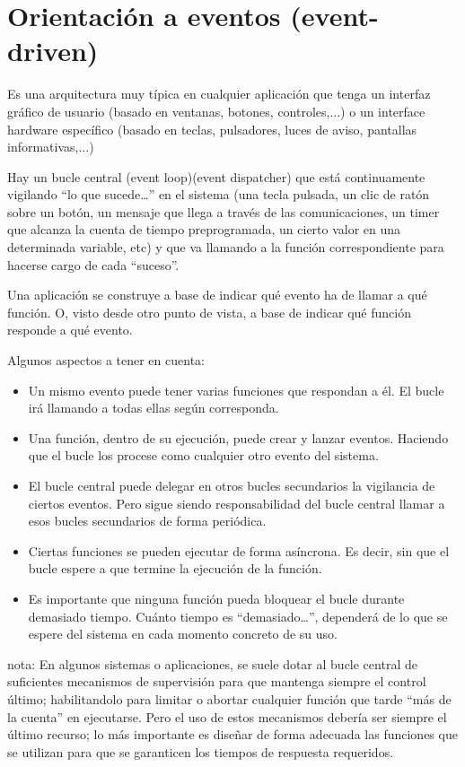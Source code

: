 \documentclass[spanish,12pt,a4paper,final,oneside]{book}
\begin{document}
\section{Orientación a eventos (event-driven)}\label{eventos}
Es una arquitectura muy típica en cualquier aplicación que tenga un interfaz gráfico de usuario (basado en ventanas, botones, controles,...) o un interface hardware específico (basado en teclas, pulsadores, luces de aviso, pantallas informativas,...)

Hay un bucle central (event loop)(event dispatcher) que está continuamente vigilando ``lo que sucede\ldots'' en el sistema (una tecla pulsada, un clic de ratón sobre un botón, un mensaje que llega a través de las comunicaciones, un timer que alcanza la cuenta de tiempo preprogramada, un cierto valor en una determinada variable, etc) y que va llamando a la función correspondiente para hacerse cargo de cada ``suceso''.

Una aplicación se construye a base de indicar qué evento ha de llamar a qué función. O, visto desde otro punto de vista, a base de indicar qué función responde a qué evento.

Algunos aspectos a tener en cuenta:
\begin{itemize}
\item Un mismo evento puede tener varias funciones que respondan a él. El bucle irá llamando a todas ellas según corresponda.
\item Una función, dentro de su ejecución, puede crear y lanzar eventos. Haciendo que el bucle los procese como cualquier otro evento del sistema.
\item El bucle central puede delegar en otros bucles secundarios la vigilancia de ciertos eventos. Pero sigue siendo responsabilidad del bucle central llamar a esos bucles secundarios de forma periódica.
\item Ciertas funciones se pueden ejecutar de forma asíncrona. Es decir, sin que el bucle espere a que termine la ejecución de la función.
\item Es importante que ninguna función pueda bloquear el bucle durante demasiado tiempo. Cuánto tiempo es ``demasiado\ldots'', dependerá de lo que se espere del sistema en cada momento concreto de su uso.
\end{itemize}

nota: En algunos sistemas o aplicaciones, se suele dotar al bucle central de suficientes mecanismos de supervisión para que mantenga siempre el control último; habilitandolo para limitar o abortar cualquier función que tarde ``más de la cuenta'' en ejecutarse. Pero el uso de estos mecanismos debería ser siempre el último recurso; lo más importante es diseñar de forma adecuada las funciones que se utilizan para que se garanticen los tiempos de respuesta requeridos.
\end{document}
